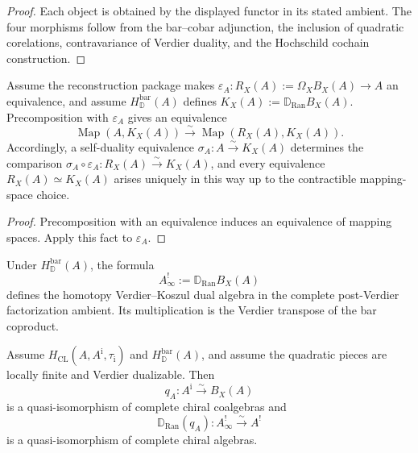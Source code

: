 \begin{proof}
Each object is obtained by the displayed functor in its stated
ambient.  The four morphisms follow from the bar--cobar adjunction,
the inclusion of quadratic corelations, contravariance of Verdier
duality, and the Hochschild cochain construction.
\end{proof}

\begin{theorem}
\label{thm:omega-bar-not-verdier-koszul-dual}
Assume the reconstruction package makes
\(\varepsilon_A\colon R_X(A):=\Omega_XB_X(A)\to A\) an equivalence,
and assume \(H_{\mathbb D}^{\mathrm{bar}}(A)\) defines
\(K_X(A):=\mathbb D_{\operatorname{Ran}}B_X(A)\).
Precomposition with \(\varepsilon_A\) gives an equivalence
\[
\operatorname{Map}(A,K_X(A))
\xrightarrow{\sim}
\operatorname{Map}(R_X(A),K_X(A)).
\]
Accordingly, a self-duality equivalence
\(\sigma_A\colon A\xrightarrow{\sim}K_X(A)\) determines the comparison
\(\sigma_A\circ\varepsilon_A\colon R_X(A)\xrightarrow{\sim}K_X(A)\),
and every equivalence \(R_X(A)\simeq K_X(A)\) arises uniquely in this
way up to the contractible mapping-space choice.
\end{theorem}

\begin{proof}
Precomposition with an equivalence induces an equivalence of mapping
spaces.  Apply this fact to \(\varepsilon_A\).
\end{proof}

\begin{corollary}
\label{cor:A-shriek-constructed}
Under \(H_{\mathbb D}^{\mathrm{bar}}(A)\), the formula
\[
A^!_\infty:=\mathbb D_{\operatorname{Ran}}B_X(A)
\]
defines the homotopy Verdier--Koszul dual algebra in the complete
post-Verdier factorization ambient.  Its multiplication is the Verdier
transpose of the bar coproduct.
\end{corollary}

\begin{corollary}
\label{cor:finite-type-verdier-koszul-dual-formality}
Assume \(H_{\mathrm{CL}}(A,A^{\mathrm i},\tau_{\mathrm i})\) and
\(H_{\mathbb D}^{\mathrm{bar}}(A)\), and assume the
quadratic pieces are locally finite and Verdier dualizable.  Then
\[
q_A\colon A^{\mathrm i}\xrightarrow{\sim}B_X(A)
\]
is a quasi-isomorphism of complete chiral coalgebras and
\[
\mathbb D_{\operatorname{Ran}}(q_A)\colon
A^!_\infty\xrightarrow{\sim}A^!
\]
is a quasi-isomorphism of complete chiral algebras.
\end{corollary}

